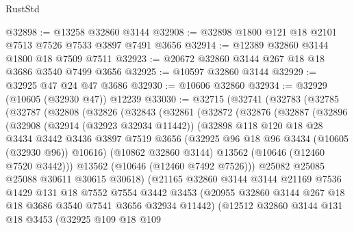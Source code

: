 \begin{lexlean}{RustStd}
\begin{coremodule}
@32898 := @13258 @32860 @3144
@32908 := @32898 @1800 @121 @18 @2101 @7513 @7526 @7533 @3897 @7491 @3656
@32914 := @12389 @32860 @3144 @1800 @18 @7509 @7511
@32923 := @20672 @32860 @3144 @267 @18 @18 @3686 @3540 @7499 @3656
@32925 := @10597 @32860 @3144
@32929 := @32925 @47 @24 @47 @3686
@32930 := @10606 @32860
@32934 := @32929 (@10605 (@32930 @47)) @12239
@33030 := @32715
    (@32741
      (@32783
        (@32785
          (@32787
            (@32808
              (@32826
                (@32843
                  (@32861
                    (@32872
                      (@32876
                        (@32887
                          (@32896
                            (@32908
                              (@32914 (@32923 @32934 @11442))
                              (@32898
                                @118
                                @120
                                @18
                                @28
                                @3434
                                @3442
                                @3436
                                @3897
                                @7519
                                @3656
                                (@32925 @96 @18 @96 @3434 (@10605 (@32930 @96)) @10616)
                                (@10862 @32860 @3144)
                                @13562
                                (@10646 (@12460 @7520 @3442)))
                              @13562
                              (@10646 (@12460 @7492 @7526)))
                            @25082
                            @25085
                            @25088
                            @30611
                            @30615
                            @30618)
                          (@21165
                            @32860
                            @3144
                            @3144
                            @21169
                            @7536
                            @1429
                            @131
                            @18
                            @7552
                            @7554
                            @3442
                            @3453
                            (@20955 @32860 @3144 @267 @18 @18 @3686 @3540 @7541 @3656 @32934 @11442)
                            (@12512
                              @32860
                              @3144
                              @131
                              @18
                              @3453
                              (@32925
                                @109
                                @18
                                @109

\end{coremodule}
\end{lexlean}
